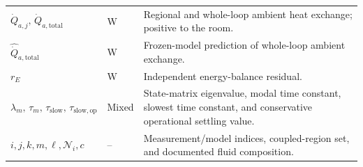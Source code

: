 \documentclass[11pt]{article}
\begin{document}
\begin{longtable}{@{}>{\raggedright\arraybackslash}p{1.78in}>{\raggedright\arraybackslash}p{1.08in}>{\raggedright\arraybackslash}p{3.62in}@{}}
$\dot Q_{a,j},\,\dot Q_{a,\mathrm{total}}$ & \si{\watt} & Regional and whole-loop ambient heat exchange; positive to the room. \\
$\widehat{\dot Q}_{a,\mathrm{total}}$ & \si{\watt} & Frozen-model prediction of whole-loop ambient exchange. \\
$r_E$ & \si{\watt} & Independent energy-balance residual. \\
$\lambda_m,\,\tau_m,\,\tau_{\mathrm{slow}},\,\tau_{\mathrm{slow,op}}$ & Mixed & State-matrix eigenvalue, modal time constant, slowest time constant, and conservative operational settling value. \\
$i,j,k,m,\ell,\mathcal N_i,c$ & -- & Measurement/model indices, coupled-region set, and documented fluid composition. \\
\end{longtable}
\endgroup
\end{document}
